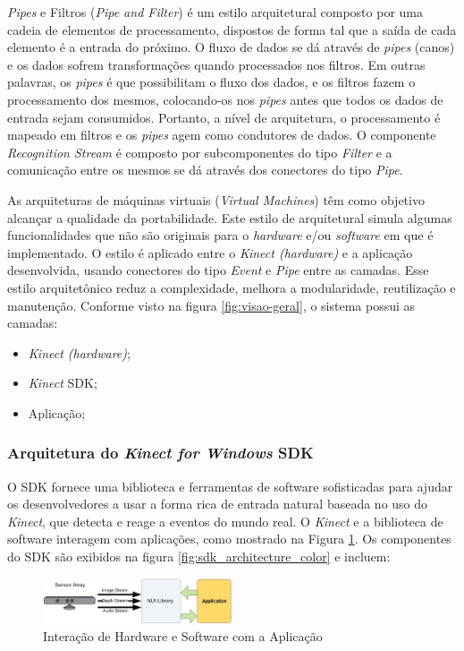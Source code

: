 \textit{Pipes} e Filtros (\textit{Pipe and Filter}) é um estilo arquitetural composto por uma cadeia de elementos de processamento, dispostos de forma tal que a saída de cada elemento é a entrada do próximo. O fluxo de dados se dá através de \textit{pipes} (canos) e os dados sofrem transformações quando processados nos filtros. Em outras palavras, os \textit{pipes} é que possibilitam o fluxo dos dados, e os filtros fazem o processamento dos mesmos, colocando-os nos \textit{pipes} antes que todos os dados de entrada sejam consumidos. Portanto, a nível de arquitetura, o processamento é mapeado em filtros e os \textit{pipes} agem como condutores de dados. O componente \textit{Recognition Stream} é composto por subcomponentes do tipo \textit{Filter} e a comunicação entre os mesmos se dá através dos conectores do tipo \textit{Pipe}. 

As arquiteturas de máquinas virtuais (\textit{Virtual Machines}) têm como objetivo alcançar a qualidade da portabilidade. Este estilo de arquitetural simula algumas funcionalidades que não são originais para o \textit{hardware} e/ou \textit{software} em que é implementado. O estilo é aplicado entre o \textit{Kinect (hardware)} e a aplicação desenvolvida, usando conectores do tipo \textit{Event} e \textit{Pipe} entre as camadas. Esse estilo arquitetônico reduz a complexidade, melhora a modularidade, reutilização e manutenção.
Conforme visto na figura \ref{fig:visao-geral}, o sistema possui as camadas:

\begin{itemize}
\item \textit{Kinect (hardware)};
\item \textit{Kinect} SDK; 
\item Aplicação; 
\end{itemize}

\subsubsection{Arquitetura do \textit{Kinect for Windows} SDK}\label{sec:kinectSDK}
O SDK fornece uma biblioteca e ferramentas de software sofisticadas para ajudar os desenvolvedores a usar a forma rica de entrada natural baseada no uso do \textit{Kinect}, que detecta e reage a eventos do mundo real. O \textit{Kinect} e a biblioteca de software interagem com aplicações, como mostrado na Figura \ref{fig:sdk_interact}. Os componentes do SDK são exibidos na figura \ref{fig:sdk_architecture_color} e incluem:

\begin{figure}[h]
\centering
\includegraphics[width=0.5\textwidth]{images/sdk_interaction.png}
\caption{Interação de Hardware e Software com a Aplicação}
\label{fig:sdk_interact}
\end{figure}



